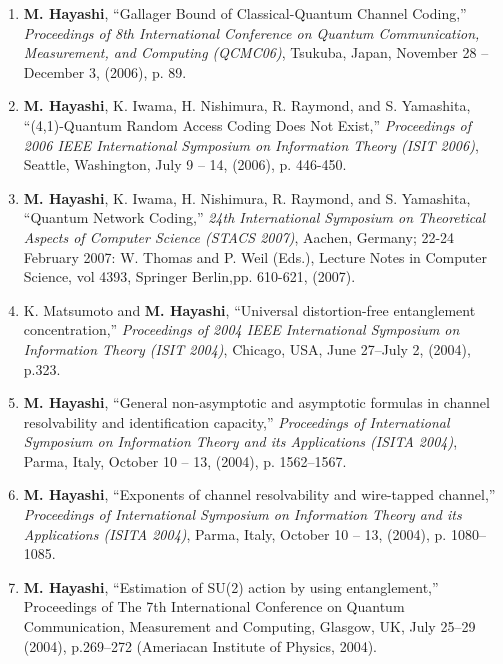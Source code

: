 \documentclass[a4paper,12pt,oneside]{article}
\begin{document}
\begin{enumerate}
    \item
    \textbf{M. Hayashi},
    ``Gallager Bound of Classical-Quantum Channel Coding,''
    {\em Proceedings of 8th International Conference on Quantum 
    Communication, Measurement, and Computing (QCMC06)},
    Tsukuba, Japan, November 28 -- December 3, (2006), p. 89.
    
    \item
    \textbf{M. Hayashi}, K. Iwama, H. Nishimura, R. Raymond, and S. Yamashita, ``(4,1)-Quantum Random Access Coding Does Not Exist,'' 
    {\em Proceedings of 2006 IEEE International Symposium on Information Theory (ISIT 2006)}, 
    Seattle, Washington, July 9 -- 14, (2006), p. 446-450.
    
    \item
    \textbf{M. Hayashi}, K. Iwama, H. Nishimura, R. Raymond, and S. Yamashita, ``Quantum Network Coding,'' 
    {\em 24th International Symposium on Theoretical Aspects of Computer Science (STACS 2007)}, Aachen, Germany; 22-24 February 2007: 
    W. Thomas and P. Weil (Eds.), Lecture Notes in Computer Science, vol 4393, Springer Berlin,pp. 610-621, (2007). 
    
    \item
    K. Matsumoto and \textbf{M. Hayashi}, ``Universal distortion-free entanglement concentration,'' 
    {\em Proceedings of 2004 IEEE International Symposium on Information Theory (ISIT 2004)}, 
    Chicago, USA, June 27--July 2, (2004), p.323.
    
    \item
    \textbf{M. Hayashi}, ``General non-asymptotic and asymptotic formulas in channel resolvability and identification capacity,'' 
    {\em Proceedings of International Symposium on Information Theory and its Applications (ISITA 2004)}, Parma, Italy, October 10 -- 13, (2004), p. 1562--1567.
    
    \item
    \textbf{M. Hayashi}, ``Exponents of channel resolvability and wire-tapped channel,'' 
    {\em Proceedings of International Symposium on Information Theory and its Applications (ISITA 2004)}, Parma, Italy, October 10 -- 13, (2004), p. 1080--1085.
    
    \item
    \textbf{M. Hayashi},
    ``Estimation of SU(2) action by using entanglement,'' 
    Proceedings of The 7th International Conference on Quantum Communication, Measurement and Computing, Glasgow, UK, July 25--29 (2004), p.269--272 (Ameriacan Institute of Physics, 2004).
    

\end{enumerate}
\end{document}
